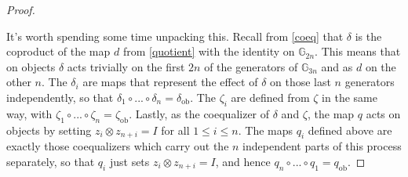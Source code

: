 \begin{proof}
\begin{eq*}
\end{eq*}
It's worth spending some time unpacking this. Recall from \cref{coeq} that $\delta$ is the coproduct of the map $d$ from \cref{quotient} with the identity on $\mathbb{G}_{2n}$. This means that on objects $\delta$ acts trivially on the first $2n$ of the generators of $\mathbb{G}_{3n}$ and as $d$ on the other $n$. The $\delta_i$ are maps that represent the effect of $\delta$ on those last $n$ generators independently, so that $\delta_1 \circ ... \circ \delta_n = \delta_{\mathrm{ob}}$. The $\zeta_i$ are defined from $\zeta$ in the same way, with $\zeta_1 \circ ... \circ \zeta_n = \zeta_{\mathrm{ob}}$. Lastly, as the coequalizer of $\delta$ and $\zeta$, the map $q$ acts on objects by setting $z_i \otimes z_{n+i} = I$ for all $1 \le i \le n$. The maps $q_i$ defined above are exactly those coequalizers which carry out the $n$ independent parts of this process separately, so that $q_i$ just sets $z_i \otimes z_{n+i} = I$, and hence $q_n \circ ... \circ q_1 = q_{\mathrm{ob}}$.


\end{proof}
